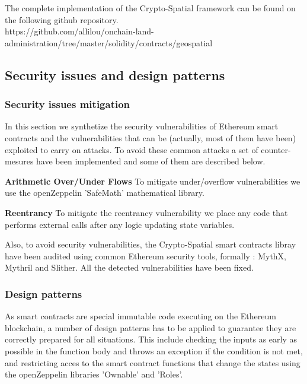\documentclass{isprs} %
\begin{document}
The complete implementation of the Crypto-Spatial framework can be found on the following github repository.\\
https://github.com/allilou/onchain-land-administration/tree/master/solidity/contracts/geospatial

\subsection{Security issues and design patterns}\label{sec:Security issues and design patterns}

\subsubsection{Security issues mitigation}\label{sec:Security issues mitigation}

In this section we synthetize the security vulnerabilities of Ethereum smart contracts and the vulnerabilities that can be (actually, most of them have been) exploited to carry on attacks. To avoid these common attacks a set of counter-mesures have been implemented and some of them are described below.

\textbf{Arithmetic Over/Under Flows}  To mitigate under/overflow vulnerabilities we use the openZeppelin 'SafeMath' mathematical library. 

\textbf{Reentrancy} To mitigate the reentrancy vulnerability we place any code that performs external calls after any logic updating state variables. 

Also, to avoid security vulnerabilities, the Crypto-Spatial smart contracts libray have been audited using common Ethereum security tools, formally : MythX, Mythril and Slither. All the detected vulnerabilities have been fixed.

\subsubsection{Design patterns}\label{sec:Design patterns}

As smart contracts are special immutable code executing on the Ethereum blockchain, a number of design patterns has to be applied to guarantee they are correctly prepared for all situations. This include checking the inputs as early as possible in the function body and throws an exception if the condition is not met, and restricting acces to the smart contract functions that change the states using the openZeppelin libraries 'Ownable' and 'Roles'.
\end{document}
